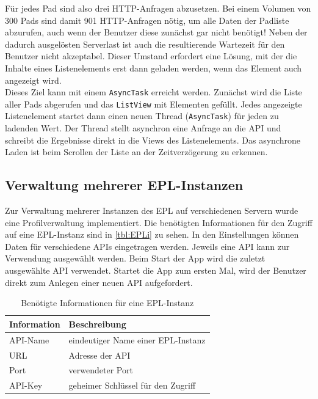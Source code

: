 Für jedes Pad sind also drei HTTP-Anfragen abzusetzen.
Bei einem Volumen von 300 Pads sind damit 901 HTTP-Anfragen nötig, um alle Daten der Padliste abzurufen, auch wenn der Benutzer diese zunächst gar nicht benötigt!
Neben der dadurch ausgelösten Serverlast ist auch die resultierende Wartezeit für den Benutzer nicht akzeptabel.
Dieser Umstand erfordert eine Lösung, mit der die Inhalte eines Listenelements erst dann geladen werden, wenn das Element auch angezeigt wird.\\
Dieses Ziel kann mit einem \texttt{AsyncTask} erreicht werden.
Zunächst wird die Liste aller Pads abgerufen und das \texttt{ListView} mit Elementen gefüllt. Jedes angezeigte Listenelement startet dann einen neuen Thread (\texttt{AsyncTask}) für jeden zu ladenden Wert.
Der Thread stellt asynchron eine Anfrage an die API und schreibt die Ergebnisse direkt in die Views des Listenelements.
Das asynchrone Laden ist beim Scrollen der Liste an der Zeitverzögerung zu erkennen.

\newpage
\subsection{Verwaltung mehrerer EPL-Instanzen}
\label{sub:implem:eplinstanzen}
Zur Verwaltung mehrerer Instanzen des EPL auf verschiedenen Servern wurde eine Profilverwaltung implementiert.
Die benötigten Informationen für den Zugriff auf eine EPL-Instanz sind in \autoref{tbl:EPLi} zu sehen.
In den Einstellungen können Daten für verschiedene APIs eingetragen werden.
Jeweils eine API kann zur Verwendung ausgewählt werden.
Beim Start der App wird die zuletzt ausgewählte API verwendet.
Startet die App zum ersten Mal, wird der Benutzer direkt zum Anlegen einer neuen API aufgefordert.

\begin{table}[h!]
    \begin{center}
      \footnotesize
      \begin{tabular}{|l|l|}
          \hline \textbf{Information} & \textbf{Beschreibung}\\
          \hline
          \hline API-Name & eindeutiger Name einer EPL-Instanz\\
          \hline URL & Adresse der API\\
          \hline Port & verwendeter Port\\
          \hline API-Key & geheimer Schlüssel für den Zugriff\\
          \hline
      \end{tabular}
    \caption{Benötigte Informationen für eine EPL-Instanz}
    \label{tbl:EPLi}
    \end{center}
\end{table}

